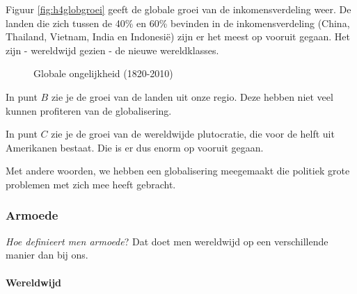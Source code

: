 Figuur \ref{fig:h4globgroei} geeft de globale groei van de inkomensverdeling weer. De landen die zich tussen de 40\% en 60\% bevinden in de inkomensverdeling (China, Thailand, Vietnam, India en Indonesi\"e) zijn er het meest op vooruit gegaan. Het zijn - wereldwijd gezien - de nieuwe wereldklasses.

\begin{figure}[H]
\small\centering\captionsetup{justification=centering,margin=2cm}
\caption{Globale ongelijkheid (1820-2010)}
\label{fig:h4wergini}
\end{figure}

In punt $B$ zie je de groei van de landen uit onze regio. Deze hebben niet veel kunnen profiteren van de globalisering.
\par In punt $C$ zie je de groei van de wereldwijde plutocratie, die voor de helft uit Amerikanen bestaat. Die is er dus enorm op vooruit gegaan.
\par Met andere woorden, we hebben een globalisering meegemaakt die politiek grote problemen met zich mee heeft gebracht.

\subsubsection{Armoede}

\par \textit{Hoe definieert men armoede}? Dat doet men wereldwijd op een verschillende manier dan bij ons.

\paragraph{Wereldwijd}

